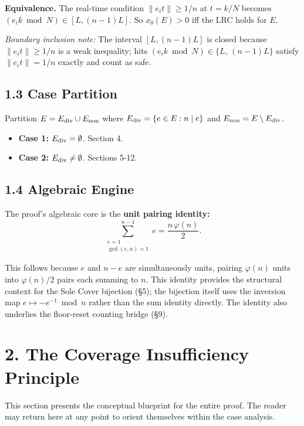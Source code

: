 \documentclass[11pt,a4paper]{article}
\theoremstyle{plain}
\theoremstyle{definition}
\theoremstyle{remark}
\begin{document}
\textbf{Equivalence.} The real-time condition $\|e_i t\| \geq 1/n$ at $t = k/N$ becomes $(e_i k \bmod N) \in [L, (n-1)L]$. So $x_0(E) > 0$ iff the LRC holds for $E$.

\textit{Boundary inclusion note:} The interval $[L, (n-1)L]$ is closed because $\|e_i t\| \geq 1/n$ is a weak inequality; hits $(e_i k \bmod N) \in \{L,\,(n-1)L\}$ satisfy $\|e_i t\| = 1/n$ exactly and count as safe.


\subsection{1.3 Case Partition}


Partition $E = E_{\rm div} \cup E_{\rm non}$ where $E_{\rm div} = \{e \in E : n \mid e\}$ and $E_{\rm non} = E \setminus E_{\rm div}$.

\begin{itemize}
\item \textbf{Case 1:} $E_{\rm div} = \emptyset$. Section 4.
\item \textbf{Case 2:} $E_{\rm div} \neq \emptyset$. Sections 5-12.
\end{itemize}


\subsection{1.4 Algebraic Engine}


The proof's algebraic core is the \textbf{unit pairing identity:}
\[\sum_{\substack{e=1 \\ \gcd(e,n)=1}}^{n-1} e = \frac{n\,\varphi(n)}{2}.\]

This follows because $e$ and $n-e$ are simultaneously units, pairing $\varphi(n)$ units into $\varphi(n)/2$ pairs each summing to $n$. This identity provides the structural context for the Sole Cover bijection (§5); the bijection itself uses the inversion map $e \mapsto -e^{-1} \bmod n$ rather than the sum identity directly. The identity also underlies the floor-reset counting bridge (§9).


\medskip



\section{2. The Coverage Insufficiency Principle}


This section presents the conceptual blueprint for the entire proof. The reader may return here at any point to orient themselves within the case analysis.
\end{document}
